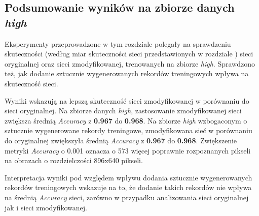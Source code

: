 \subsection{Podsumowanie wyników na zbiorze danych \textit{high}}
Eksperymenty przeprowadzone w tym rozdziale polegały na sprawdzeniu skuteczności (według miar skuteczności sieci przedstawionych w rozdziale ) sieci oryginalnej oraz sieci zmodyfikowanej, trenowanych na zbiorze \textit{high}.
Sprawdzono też, jak dodanie sztucznie wygenerowanych rekordów treningowych wpływa na skuteczność sieci.


Wyniki wskazują na lepszą skuteczność sieci zmodyfikowanej w porównaniu do sieci oryginalnej.
Na zbiorze danych \textit{high}, zastosowanie zmodyfikowanej sieci zwiększa średnią \textit{Accuracy} z \textbf{0.967} do \textbf{0.968}.
Na zbiorze \textit{high} wzbogaconym o sztucznie wygenerowane rekordy treningowe, zmodyfikowana sieć w porównaniu do oryginalnej zwiększyła średnią \textit{Accuracy} z \textbf{0.967} do \textbf{0.968}.
Zwiększenie metryki \textit{Accuracy} o 0.001 oznacza o 573 więcej poprawnie rozpoznanych pikseli na obrazach o rozdzielczości 896x640 pikseli.


Interpretacja wyniki pod względem wpływu dodania sztucznie wygenerowanych rekordów treningowych wskazuje na to, że dodanie takich rekordów nie wpływa na średnią \textit{Accuracy} sieci, zarówno w przypadku analizowania sieci oryginalnej jak i sieci zmodyfikowanej.
